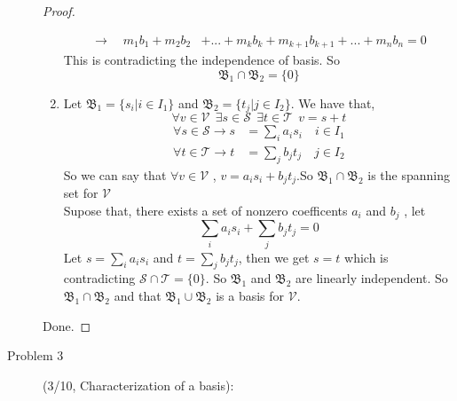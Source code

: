 \documentclass[a4paper]{article}
\begin{document}
\begin{description}
\begin{proof}
\begin{enumerate}
\begin{align*}
          \to\quad  m_{1}b_{1}+m_{2}b_{2} & +...+m_{k}b_{k}+m_{k+1}b_{k+1}+...+m_{n}b_{n}=0
        \end{align*}
        This is contradicting the independence of basis. So
        $$\text{$\mathfrak{B}_{1}\cap\mathfrak{B}_{2}=\{0\}$}$$
        \item Let $\mathfrak{B}_{1}=\{s_{i} | i \in I_{1}\}$
        and $\mathfrak{B}_{2}=\{t_{j} | j \in I_{2}\}$. We have that,
        $$\forall v \in \mathcal{V}\ \  \exists s \in \mathcal{S} \ \  \exists t \in \mathcal{T} \ \ v=s+t$$
        \begin{align*}
          \forall s \in \mathcal{S} \to s &=\sum_{i} a_{i}s_{i} \quad i \in I_{1}\\
          \forall t \in \mathcal{T} \to t &=\sum_{j} b_{j}t_{j} \quad j \in I_{2}
        \end{align*}
        So we can say that $\forall v \in \mathcal{V}$  , $v=a_{i}s_{i}+b_{j}t_{j}$.So
         $\mathfrak{B}_{1}\cap \mathfrak{B}_{2}$ is the spanning set for
        $\mathcal{V}$\\
        Supose that, there exists a set of nonzero coefficents $a_{i}$ and $b_{j}$ , let
        $$\sum_{i} a_{i}s_{i}+\sum_{j} b_{j}t_{j}=0$$
        Let $s=\sum_{i} a_{i}s_{i}$ and $t=\sum_{j} b_{j}t_{j}$, then we get $s=t$
        which is contradicting $\mathcal{S}\cap\mathcal{T}=\{0\}$. So $\mathfrak{B}_{1}$ and $\mathfrak{B}_{2}$ are linearly independent.
        So $\mathfrak{B}_{1}\cap\mathfrak{B}_{2}$ and that $\mathfrak{B}_{1}\cup\mathfrak{B}_{2}$ is a basis for $\mathcal{V}$.
    \end{enumerate}
      Done.
    \end{proof}
    \item[Problem 3](3/10, Characterization of a basis):{

}
\end{description}
\end{document}
